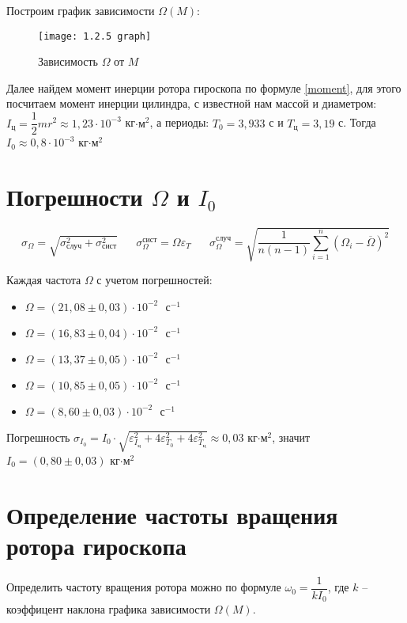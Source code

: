 \documentclass[a4paper,12pt]{article}
\begin{document}
	Построим график зависимости $\Omega(M)$:
	\begin{figure}[h!]
		\texttt{[image: 1.2.5 graph]}
		\caption{Зависимость $ \Omega $ от $ M $}
		\label{graph}
	\end{figure}

	Далее найдем момент инерции ротора гироскопа по формуле \eqref{moment}, для этого посчитаем момент инерции цилиндра, с известной нам массой и диаметром: $I_\text{ц} = \dfrac{1}{2}mr^2 \approx 1,23\cdot 10^{-3}$ кг$\cdot \text{м}^2$, а периоды: $T_0 = 3,933$ с и $T_\text{ц} = 3,19$ с. Тогда $I_0 \approx 0,8\cdot 10^{-3}$ кг$\cdot \text{м}^2$

	\section{Погрешности $\Omega$ и $I_0$}

	\begin{equation}
		\sigma_\Omega = \sqrt{ \sigma_\text{случ}^2 + \sigma_\text{сист}^2} \;\;\;\;\;\; \sigma_\Omega^\text{сист} = \Omega \varepsilon_T \;\;\;\;\;\; \sigma_\Omega^\text{случ}=  \sqrt{\frac{1}{n(n-1)} \sum_{i=1}^{n}(\Omega_i - \overline{\Omega})^2}
	\end{equation}

	Каждая частота $\Omega$ с учетом погрешностей:
	\begin{itemize}
		\item $\Omega = (21,08 \pm 0,03)\cdot10^{-2}\text{ }\text{с}^{-1}$
		\item $\Omega = (16,83 \pm 0,04)\cdot10^{-2}\text{ }\text{с}^{-1}$
		\item $\Omega = (13,37 \pm 0,05)\cdot10^{-2}\text{ }\text{с}^{-1}$
		\item $\Omega = (10,85 \pm 0,05)\cdot10^{-2}\text{ }\text{с}^{-1}$
		\item $\Omega = (8,60 \pm 0,03)\cdot10^{-2}\text{ }\text{с}^{-1}$
	\end{itemize}

	Погрешность $\sigma_{I_0} = I_0\cdot\sqrt{\varepsilon_{I_\text{ц}}^2+ 4\varepsilon_{T_0}^2+ 4\varepsilon_{T_\text{ц}}^2 } \approx 0,03$ кг$\cdot \text{м}^2$, значит $I_0 = (0,80\pm 0,03)$ кг$\cdot \text{м}^2$

	\section{Определение частоты вращения ротора гироскопа}

	Определить частоту вращения ротора можно по формуле $\omega_0 = \dfrac{1}{kI_0}$, где $k$ -- коэффицент наклона графика зависимости $\Omega(M)$.
\end{document}

